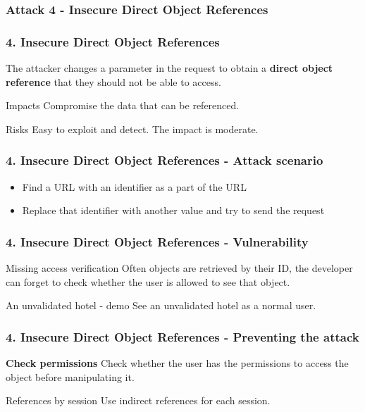 \subsubsection{Attack 4 - Insecure Direct Object References}

\begin{frame}
\frametitle{4. Insecure Direct Object References}
The attacker changes a parameter in the request to obtain a \textbf{direct
object reference} that they should not be able to access.
\begin{block}{Impacts}
Compromise the data that can be referenced.
\end{block}
\begin{block}{Risks}
\alert{Easy} to exploit and detect. The impact is moderate.
\end{block}
\end{frame}

\begin{frame}
\frametitle{4. Insecure Direct Object References - Attack scenario}
\begin{itemize}
\item Find a URL with an identifier as a part of the URL
\item Replace that identifier with another value and try to send the request
\end{itemize}
\end{frame}

\begin{frame}
\frametitle{4. Insecure Direct Object References - Vulnerability}
\begin{block}{Missing access verification}
Often objects are retrieved by their ID, the developer can forget to check
whether the user is allowed to see that object.
\end{block}
\pause
\begin{exampleblock}{An unvalidated hotel - demo}
See an unvalidated hotel as a normal user.
\end{exampleblock}
\end{frame}

\begin{frame}
\frametitle{4. Insecure Direct Object References - Preventing the attack}
\begin{block}{\textbf{Check permissions}}
Check whether the user has the permissions to access the object before
manipulating it.
\end{block}
\begin{block}{References by session}
Use indirect references for each session.
\end{block}
\end{frame}

